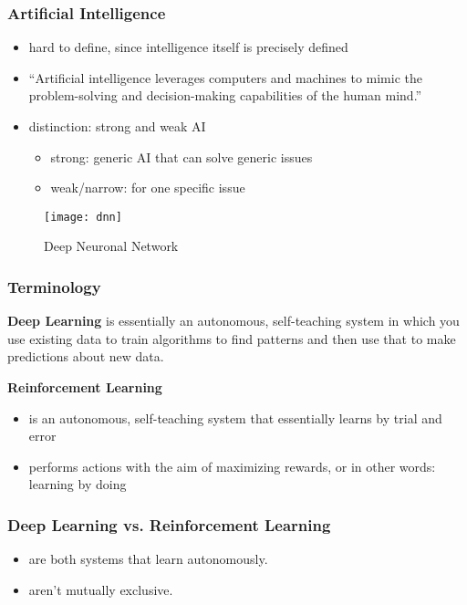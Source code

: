 \begin{frame}
    \frametitle{Artificial Intelligence}

    \begin{itemize}
        \item hard to define, since intelligence itself is precisely defined
        \item ``Artificial intelligence leverages computers and machines to mimic the problem-solving and decision-making capabilities of the human mind.''
        \item distinction: strong and weak AI
        \begin{itemize}
            \item strong: generic AI that can solve generic issues
            \item weak/narrow: for one specific issue
        \end{itemize}
    \end{itemize}

    \begin{figure}
        \texttt{[image: dnn]}
        \caption{Deep Neuronal Network}
        \label{fig:dnn}
    \end{figure}
\end{frame}

\begin{frame}
    \frametitle{Terminology}
    \textbf{Deep Learning}
    is essentially an autonomous, self-teaching system in which you use existing data to train algorithms
    to find patterns and then use that to make predictions about new data.

    \textbf{Reinforcement Learning}
    \begin{itemize}
        \item is an autonomous, self-teaching system that essentially learns by trial and error
        \item performs actions with the aim of maximizing rewards, or in other words: learning by doing
    \end{itemize}

    \frametitle{Deep Learning vs. Reinforcement Learning}
    \begin{itemize}
        \item are both systems that learn autonomously.
        \item aren't mutually exclusive.
    \end{itemize}
\end{frame}

